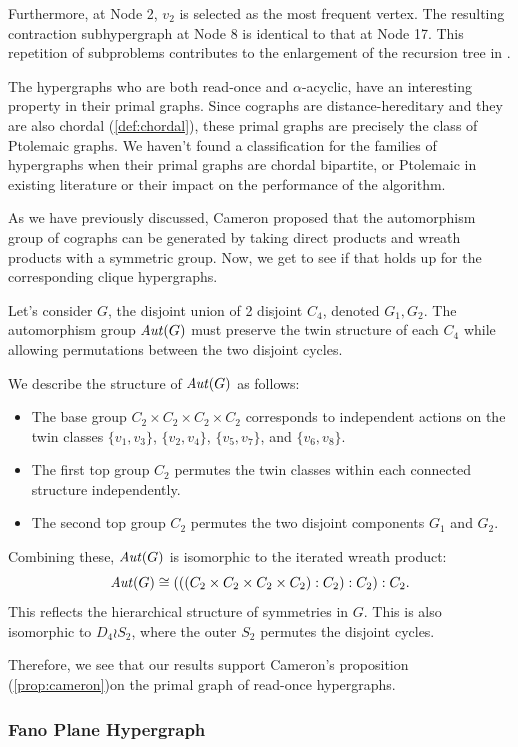 Furthermore, at Node 2, $v_2$ is selected as the most frequent vertex. The resulting contraction subhypergraph at Node 8 is identical to that at Node 17. This repetition of subproblems contributes to the enlargement of the recursion tree in \FKA.

The hypergraphs who are both read-once and $\alpha$-acyclic, have an interesting property in their primal graphs. Since cographs are distance-hereditary and they are also chordal (\ref{def:chordal}), these primal graphs are precisely the class of Ptolemaic graphs. We haven't found a classification for the families of hypergraphs when their primal graphs are chordal bipartite, or Ptolemaic in existing literature or their impact on the performance of the \FKA{} algorithm.

As we have previously discussed, Cameron proposed \cite{Cam22} that the automorphism group of cographs can be generated by taking direct products and wreath products with a symmetric group. Now, we get to see if that holds up for the corresponding clique hypergraphs.

Let's consider $G$, the disjoint union of 2 disjoint $C_4$, denoted $G_1,G_2$. The automorphism group $\mathit{Aut}(G)$ must preserve the twin structure of each $C_4$ while allowing permutations between the two disjoint cycles.

We describe the structure of $\mathit{Aut}(G)$ as follows:
\begin{itemize}
\item The base group $C_2\times C_2\times C_2\times C_2$ corresponds to independent actions on the twin classes $\{v_1,v_3\}$, $\{v_2,v_4\}$, $\{v_5,v_7\}$, and $\{v_6,v_8\}$.
\item The first top group $C_2$ permutes the twin classes within each connected structure independently.
\item The second top group $C_2$ permutes the two disjoint components $G_1$ and $G_2$.
\end{itemize}

Combining these, $\mathit{Aut}(G)$ is isomorphic to the iterated wreath product:
\[
\mathit{Aut}(G)\cong(((C_2\times C_2\times C_2\times C_2):C_2):C_2):C_2.
\]
This reflects the hierarchical structure of symmetries in $G$. This is also isomorphic to $D_4\wr S_2$, where the outer $S_2$ permutes the disjoint cycles.

Therefore, we see that our results support Cameron's proposition (\ref{prop:cameron})on the primal graph of read-once hypergraphs.

\subsubsection*{Fano Plane Hypergraph}

